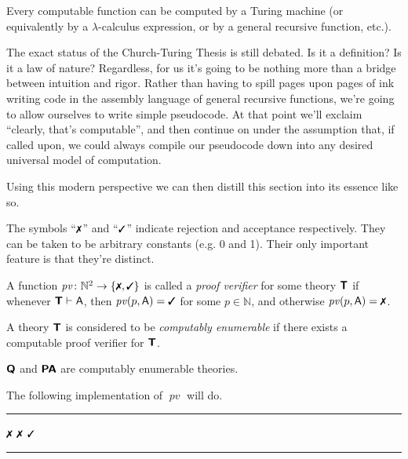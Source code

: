 \documentclass{article}
\theoremstyle{customstyle}
\newenvironment{prf-sketch}{\begin{mdframed}[skipabove=5pt, backgroundcolor=Gray!10, topline=false, bottomline=false, leftline=false, rightline=false]\renewcommand{\proofname}{Proof Sketch}\begin{proof}}{\end{proof}\end{mdframed}}
\newenvironment{algo}{\begin{samepage}\medskip\hrule\begin{algorithmic}}{\end{algorithmic}\hrule\medskip\end{samepage}}
\newcommand{\fm}[1]{\mathsf{#1}}
\DeclareMathOperator{\pc}{\mathit{pv}}
\newcommand{\T}{\textbf{\textsf{T}}}
\newcommand{\Q}{\textbf{\textsf{Q}}}
\newcommand{\PA}{\textbf{\textsf{PA}}}
\newcommand{\cmark}{\text{\small \ding{51}}}
\newcommand{\xmark}{\text{\small \ding{55}}}
\begin{document}
\begin{thesis}
  Every computable function can be computed by a Turing machine (or equivalently by a $\lambda$-calculus expression, or by a general recursive function, etc.).
\end{thesis}

The exact status of the Church-Turing Thesis is still debated. Is it a definition? Is it a law of nature? Regardless, for us it's going to be nothing more than a bridge between intuition and rigor. Rather than having to spill pages upon pages of ink writing code in the assembly language of general recursive functions, we're going to allow ourselves to write simple pseudocode. At that point we'll exclaim ``clearly, that's computable'', and then continue on under the assumption that, if called upon, we could always compile our pseudocode down into any desired universal model of computation.

Using this modern perspective we can then distill this section into its essence like so.

\begin{definition}[$\xmark$, $\cmark$]
The symbols ``$\xmark$'' and ``$\cmark$'' indicate rejection and acceptance respectively. They can be taken to be arbitrary constants (e.g. 0 and 1). Their only important feature is that they're distinct.
\end{definition}

\begin{definition}
  A function $\pc \colon \mathbb{N}^2 \to \{\xmark, \cmark\}$ is called a \emph{proof verifier} for some theory $\T$ if whenever $\T \vdash \fm{A}$, then $\pc(p, \fm{A}) = \cmark$ for some $p \in \mathbb{N}$, and otherwise $\pc(p, \fm{A}) = \xmark$.
\end{definition}

\begin{definition}
  A theory $\T$ is considered to be \textit{computably enumerable} if there exists a computable proof verifier for $\T$.
\end{definition}

\begin{theorem}
  $\Q$ and $\PA$ are computably enumerable theories.
\end{theorem}

\begin{prf-sketch}
The following implementation of $\pc$ will do.
\begin{algo}
  \Function{$\pc(p, x)$}{}
  \State \Return $\xmark$
  \EndIf
  \EndFor
  \State \Return $\xmark$
  \EndIf
  \State \Return $\cmark$
  \EndFunction
\end{algo}
\end{prf-sketch}
\end{document}
